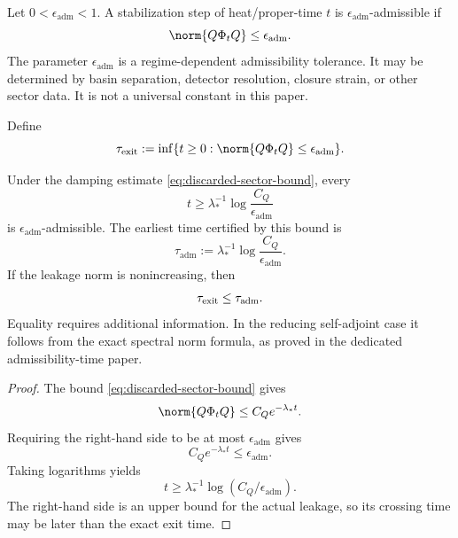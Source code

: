 \documentclass[11pt]{article}
\newcommand{\ta}{\tau_{\mathrm{adm}}}
\newcommand{\epsadm}{\epsilon_{\mathrm{adm}}}
\begin{document}
\begin{definition}
\label{def:admissible-residual-leakage}
Let \(0<\epsadm<1\). A stabilization step of heat/proper-time \(t\) is
\(\epsadm\)-admissible if
\begin{equation}
  \norm{Q\Phi_tQ}\le \epsadm.
\end{equation}
The parameter \(\epsadm\) is a regime-dependent admissibility tolerance. It may be determined
by basin separation, detector resolution, closure strain, or other sector data. It is not a
universal constant in this paper.
\end{definition}

\begin{definition}
\label{def:exact-exit-time}
Define
\begin{equation}
  \tau_{\rm exit}
  :=
  \inf\{t\ge0:\norm{Q\Phi_tQ}\le\epsadm\}.
\end{equation}
\end{definition}

\begin{proposition}
\label{prop:minimal-admissible-time}
Under the damping estimate \eqref{eq:discarded-sector-bound}, every
\begin{equation}
  t\ge
  \lambda_\ast^{-1}
  \log\frac{C_Q}{\epsadm}
\end{equation}
is \(\epsadm\)-admissible. The earliest time certified by this bound is
\begin{equation}
  \ta
  :=
  \lambda_\ast^{-1}
  \log\frac{C_Q}{\epsadm}.
  \label{eq:tau-adm}
\end{equation}
If the leakage norm is nonincreasing, then
\begin{equation}
  \tau_{\rm exit}\le\ta.
\end{equation}
Equality requires additional information. In the reducing self-adjoint case it follows from
the exact spectral norm formula, as proved in the dedicated admissibility-time paper.
\end{proposition}

\begin{proof}
The bound \eqref{eq:discarded-sector-bound} gives
\begin{equation}
  \norm{Q\Phi_tQ}
  \le
  C_Qe^{-\lambda_\ast t}.
\end{equation}
Requiring the right-hand side to be at most \(\epsadm\) gives
\begin{equation}
  C_Qe^{-\lambda_\ast t}\le\epsadm.
\end{equation}
Taking logarithms yields
\begin{equation}
  t\ge
  \lambda_\ast^{-1}\log(C_Q/\epsadm).
\end{equation}
The right-hand side is an upper bound for the actual leakage, so its crossing time may be
later than the exact exit time.
\end{proof}
\end{document}
